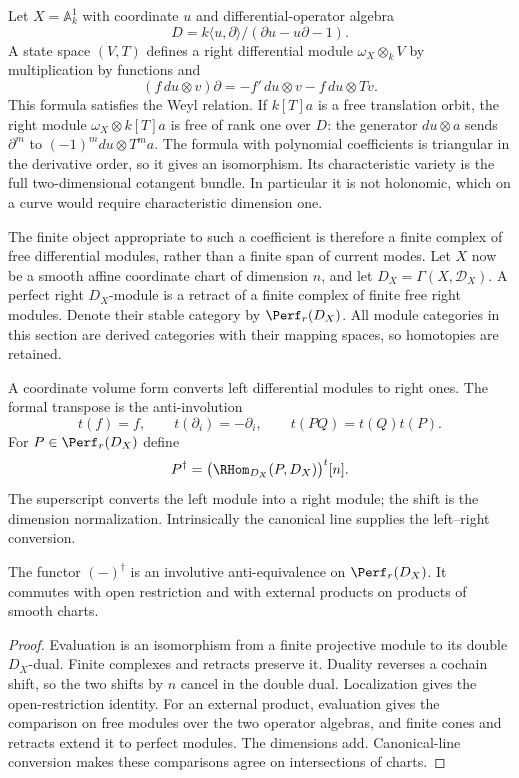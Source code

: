 Let $X=\mathbb A^1_k$ with coordinate $u$ and differential-operator
algebra
\[
 D=k\langle u,\partial\rangle/(\partial u-u\partial-1).
\]
A state space $(V,T)$ defines a right differential module
$\omega_X\otimes_kV$ by multiplication by functions and
\begin{equation}\label{cyjets:eq:right-current}
 (f\,du\otimes v)\partial
       =-f'\,du\otimes v-f\,du\otimes Tv.
\end{equation}
This formula satisfies the Weyl relation. If $k[T]a$ is a free
translation orbit, the right module $\omega_X\otimes k[T]a$
is free of rank one over $D$: the generator $du\otimes a$
sends $\partial^m$ to $(-1)^mdu\otimes T^ma$. The formula
with polynomial coefficients is triangular in the derivative order,
so it gives an isomorphism. Its characteristic variety is the full
two-dimensional cotangent bundle. In particular it is not holonomic,
which on a curve would require characteristic dimension one.

The finite object appropriate to such a coefficient is therefore
a finite complex of free differential modules, rather than a finite
span of current modes. Let $X$ now be a smooth affine coordinate
chart of dimension $n$, and let $D_X=\Gamma(X,\mathcal D_X)$.
A perfect right $D_X$-module is a retract of a finite complex of
finite free right modules. Denote their stable category by
$\Perf_r(D_X)$. All module categories in this section are derived
categories with their mapping spaces, so homotopies are retained.

A coordinate volume form converts left differential modules to right
ones. The formal transpose is the anti-involution
\[
 t(f)=f,\qquad t(\partial_i)=-\partial_i,\qquad
 t(PQ)=t(Q)t(P).
\]
For $P\in\Perf_r(D_X)$ define
\begin{equation}\label{cyjets:eq:dagger}
 P^\dagger=\bigl(\RHom_{D_X}(P,D_X)\bigr)^t[n].
\end{equation}
The superscript converts the left module into a right module; the
shift is the dimension normalization. Intrinsically the canonical
line supplies the left--right conversion.

\begin{lemma}\label{cyjets:lem:perfect}
The functor $(-)^\dagger$ is an involutive anti-equivalence on
$\Perf_r(D_X)$. It commutes with open restriction and with external
products on products of smooth charts.
\end{lemma}
\begin{proof}
Evaluation is an isomorphism from a finite projective module to
its double $D_X$-dual. Finite complexes and retracts preserve it.
Duality reverses a cochain shift, so the two shifts by $n$ cancel
in the double dual. Localization gives the open-restriction identity.
For an external product, evaluation gives the comparison on free
modules over the two operator algebras, and finite cones and retracts
extend it to perfect modules. The dimensions add. Canonical-line
conversion makes these comparisons agree on intersections of charts.
\end{proof}

